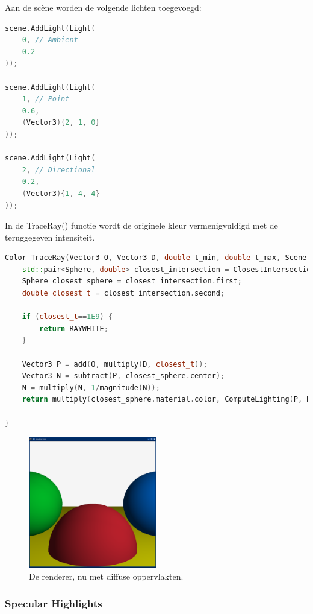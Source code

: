 \documentclass[12pt, a4paper]{article}
\begin{document}
Aan de scène worden de volgende lichten toegevoegd:

\begin{lstlisting}[language=C++]
scene.AddLight(Light(
    0, // Ambient
    0.2
));

scene.AddLight(Light(
    1, // Point
    0.6,
    (Vector3){2, 1, 0}
));

scene.AddLight(Light(
    2, // Directional
    0.2,
    (Vector3){1, 4, 4}
));
\end{lstlisting}

In de TraceRay() functie wordt de originele kleur vermenigvuldigd met de teruggegeven intensiteit. 

\begin{lstlisting}[language=C++]
Color TraceRay(Vector3 O, Vector3 D, double t_min, double t_max, Scene scene) {   
    std::pair<Sphere, double> closest_intersection = ClosestIntersection(O, D, t_min, t_max, scene);
    Sphere closest_sphere = closest_intersection.first;
    double closest_t = closest_intersection.second;

    if (closest_t==1E9) {
        return RAYWHITE;
    }

    Vector3 P = add(O, multiply(D, closest_t));
    Vector3 N = subtract(P, closest_sphere.center);
    N = multiply(N, 1/magnitude(N));
    return multiply(closest_sphere.material.color, ComputeLighting(P, N, multiply(D, -1), scene));

}
\end{lstlisting}

\begin{figure}[H]
    \centering
    \includegraphics[width=0.50\textwidth]{renders/diffused.png}
    \caption{De renderer, nu met diffuse oppervlakten.}
    \label{fig:diffused}
\end{figure}

\subsubsection{Specular Highlights}
\end{document}
